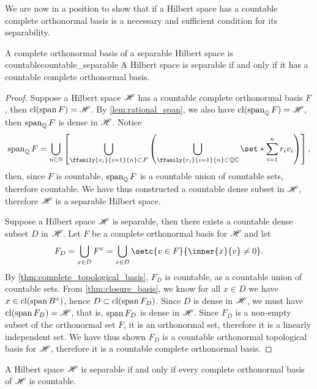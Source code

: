 We are now in a position to show that if a Hilbert space has a countable complete orthonormal basis is a necessary and sufficient condition for its separability.
\begin{theorem}{A complete orthonormal basis of a separable Hilbert space is countable}{countable_separable}
    A Hilbert space is separable if and only if it has a countable complete orthonormal basis.
\end{theorem}
\begin{proof}
    Suppose a Hilbert space \(\mathscr{H}\) has a countable complete orthonormal basis \(F\), then \(\operatorname{cl}(\operatorname{span} F) = \mathscr{H}\). By \cref{lem:rational_span}, we also have \(\operatorname{cl}(\operatorname{span}_\mathbb{Q} F) = \mathscr{H}\), then \(\operatorname{span}_\mathbb{Q} F\) is dense in \(\mathscr{H}\). Notice
    \begin{equation*}
        \lspan_\mathbb{Q} F = \bigcup_{n\in \mathbb{N}} \left[\bigcup_{\ffamily{v_i}{i=1}{n} \subset F} \left(\bigcup_{\ffamily{r_i}{i=1}{n} \subset \mathbb{Q}\mathbb{C}} \set*{\sum_{i=1}^n r_i v_i}\right)\right],
    \end{equation*}
    then, since \(F\) is countable, \(\operatorname{span}_{\mathbb{Q}}F\) is a countable union of countable sets, therefore countable. We have thus constructed a countable dense subset in \(\mathscr{H}\), therefore \(\mathscr{H}\) is a separable Hilbert space.

    Suppose a Hilbert space \(\mathscr{H}\) is separable, then there exists a countable dense subset \(D\) in \(\mathscr{H}\). Let \(F\) be a complete orthonormal basis for \(\mathscr{H}\) and let
    \begin{equation*}
        F_D = \bigcup_{x \in D} F^x = \bigcup_{x \in D} \setc{v \in F}{\inner{x}{v} \neq 0}.
    \end{equation*}
    By \cref{thm:complete_topological_basis}, \(F_D\) is countable, as a countable union of countable sets. From \cref{thm:closure_basis}, we know for all \(x \in D\) we have \(x \in \operatorname{cl}(\operatorname{span} B^x)\), hence \(D \subset \operatorname{cl}(\operatorname{span} F_D)\). Since \(D\) is dense in \(\mathscr{H}\), we must have \(\operatorname{cl}(\operatorname{span} F_D) = \mathscr{H}\), that is, \(\operatorname{span} F_D\) is dense in \(\mathscr{H}\). Since \(F_D\) is a non-empty subset of the orthonormal set \(F\), it is an orthonormal set, therefore it is a linearly independent set. We have thus shown \(F_D\) is a countable orthonormal topological basis for \(\mathscr{H}\), therefore it is a countable complete orthonormal basis.
\end{proof}
\begin{corollary}
    A Hilbert space \(\mathscr{H}\) is separable if and only if every complete orthonormal basis of \(\mathscr{H}\) is countable.
\end{corollary}
